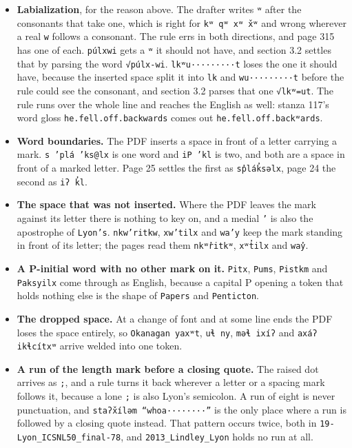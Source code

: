 \begin{itemize}
\item \textbf{Labialization}, for the reason above. The drafter writes \texttt{ʷ} after the consonants that take one, which is right for \texttt{kʷ qʷ xʷ x̌ʷ} and wrong wherever a real \texttt{w} follows a consonant. The rule errs in both directions, and page 315 has one of each. \texttt{púlxwi} gets a \texttt{ʷ} it should not have, and section 3.2 settles that by parsing the word \texttt{√púlx-\allowbreak{}wi}. \texttt{lkʷu·········t} loses the one it should have, because the inserted space split it into \texttt{lk} and \texttt{wu·········t} before the rule could see the consonant, and section 3.2 parses that one \texttt{√lkʷ=ut}. The rule runs over the whole line and reaches the English as well: stanza 117's word gloss \texttt{he.\allowbreak{}fell.\allowbreak{}off.\allowbreak{}backwards} comes out \texttt{he.\allowbreak{}fell.\allowbreak{}off.\allowbreak{}backʷards}.
\item \textbf{Word boundaries.} The PDF inserts a space in front of a letter carrying a mark. \texttt{s ’plá ’ks@lx} is one word and \texttt{i\allowbreak{}P ’kl} is two, and both are a space in front of a marked letter. Page 25 settles the first as \texttt{sp̓lák̓səlx}, page 24 the second as \texttt{iʔ k̓l}.
\item \textbf{The space that was not inserted.} Where the PDF leaves the mark against its letter there is nothing to key on, and a medial \texttt{’} is also the apostrophe of \texttt{Lyon’s}. \texttt{nkw’ritkw}, \texttt{xw’tilx} and \texttt{wa’y} keep the mark standing in front of its letter; the pages read them \texttt{nkʷr̓itkʷ}, \texttt{xʷt̓ilx} and \texttt{way̓}.
\item \textbf{A P-initial word with no other mark on it.} \texttt{Pitx}, \texttt{Pums}, \texttt{Pistkm} and \texttt{Paksyilx} come through as English, because a capital P opening a token that holds nothing else is the shape of \texttt{Papers} and \texttt{Penticton}.
\item \textbf{The dropped space.} At a change of font and at some line ends the PDF loses the space entirely, so \texttt{Okanagan yaxʷt}, \texttt{uɬ ny}, \texttt{məɬ ixíʔ} and \texttt{axáʔ ikɬcítxʷ} arrive welded into one token.
\item \textbf{A run of the length mark before a closing quote.} The raised dot arrives as \texttt{;}, and a rule turns it back wherever a letter or a spacing mark follows it, because a lone \texttt{;} is also Lyon's semicolon. A run of eight is never punctuation, and \texttt{staʔx̌íləm “whoa········”} is the only place where a run is followed by a closing quote instead. That pattern occurs twice, both in \texttt{19-\allowbreak{}Lyon\_\allowbreak{}ICSNL50\_\allowbreak{}final-\allowbreak{}78}, and \texttt{2013\_\allowbreak{}Lindley\_\allowbreak{}Lyon} holds no run at all.

\end{itemize}
